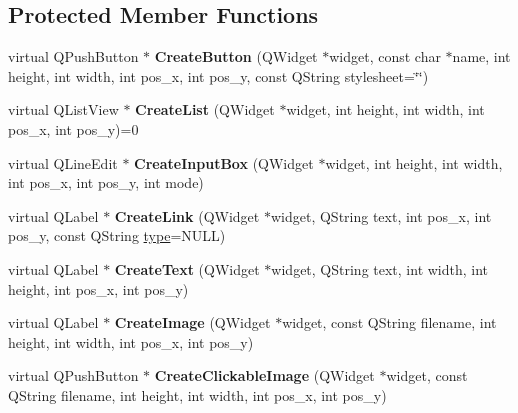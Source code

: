 \subsection*{Protected Member Functions}
\begin{DoxyCompactItemize}
\item 
\hypertarget{class_q_window_a_p_i_a178d3e0dbd8873879d3f08f97ee0a772}{
virtual QPushButton $\ast$ {\bfseries CreateButton} (QWidget $\ast$widget, const char $\ast$name, int height, int width, int pos\_\-x, int pos\_\-y, const QString stylesheet=\char`\"{}\char`\"{})}
\label{class_q_window_a_p_i_a178d3e0dbd8873879d3f08f97ee0a772}

\item 
\hypertarget{class_q_window_a_p_i_a439a14ace5436d4c2ed7627fc4e972ec}{
virtual QListView $\ast$ {\bfseries CreateList} (QWidget $\ast$widget, int height, int width, int pos\_\-x, int pos\_\-y)=0}
\label{class_q_window_a_p_i_a439a14ace5436d4c2ed7627fc4e972ec}

\item 
\hypertarget{class_q_window_a_p_i_a2d2c92d10ce54ea32ceb8928b2733572}{
virtual QLineEdit $\ast$ {\bfseries CreateInputBox} (QWidget $\ast$widget, int height, int width, int pos\_\-x, int pos\_\-y, int mode)}
\label{class_q_window_a_p_i_a2d2c92d10ce54ea32ceb8928b2733572}

\item 
\hypertarget{class_q_window_a_p_i_ac637916d5e5e2b72d3549afc8ed607a1}{
virtual QLabel $\ast$ {\bfseries CreateLink} (QWidget $\ast$widget, QString text, int pos\_\-x, int pos\_\-y, const QString \hyperlink{classtype}{type}=NULL)}
\label{class_q_window_a_p_i_ac637916d5e5e2b72d3549afc8ed607a1}

\item 
\hypertarget{class_q_window_a_p_i_ad3c7dfefa0a822e4ae4f4223704981d9}{
virtual QLabel $\ast$ {\bfseries CreateText} (QWidget $\ast$widget, QString text, int width, int height, int pos\_\-x, int pos\_\-y)}
\label{class_q_window_a_p_i_ad3c7dfefa0a822e4ae4f4223704981d9}

\item 
\hypertarget{class_q_window_a_p_i_a8bff56b9568061b2c004d6e8b3c5dcaa}{
virtual QLabel $\ast$ {\bfseries CreateImage} (QWidget $\ast$widget, const QString filename, int height, int width, int pos\_\-x, int pos\_\-y)}
\label{class_q_window_a_p_i_a8bff56b9568061b2c004d6e8b3c5dcaa}

\item 
\hypertarget{class_q_window_a_p_i_aab8041714388aabab71843ca09fac646}{
virtual QPushButton $\ast$ {\bfseries CreateClickableImage} (QWidget $\ast$widget, const QString filename, int height, int width, int pos\_\-x, int pos\_\-y)}
\label{class_q_window_a_p_i_aab8041714388aabab71843ca09fac646}


\end{DoxyCompactItemize}
